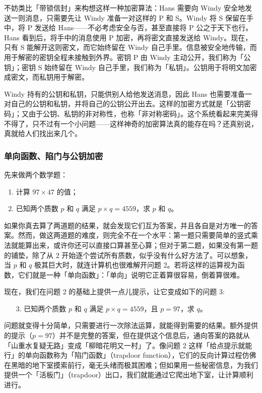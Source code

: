 不妨类比「带锁信封」来构想这样一种加密算法：Hans 需要向 Windy 安全地发送一则消息，只需要先让 Windy 准备一对这样的 P 和 S。Windy 将 S 保留在手中，将 P 发送给 Hans——不必考虑安全与否，甚至直接将 P 公之于天下也行。Hans 看到后，将手中的消息使用 P 加密，再将密文直接发送给 Windy。现在，只有 S 能解开这则密文，而它始终留在 Windy 自己手里。信息被安全地传输，而用于解密的密钥全程未接触到外界。密钥 P 由 Windy 主动公开，我们称为「公钥」；密钥 S 始终留在 Windy 自己手里，我们称为「私钥」。公钥用于将明文加密成密文，而私钥用于解密。

Windy 持有的公钥和私钥，只能供别人给他发送消息，因此 Hans 也需要准备一对自己的公钥和私钥，并将自己的公钥公开出去。这样的加密方式就是「公钥密码」；又由于公钥、私钥的非对称性，也称「非对称密码」。这个系统看起来完美得不得了，只不过有一个小问题——这样神奇的加密算法真的能存在吗？还真别说，真就给人们找出来几个。

\subsubsection{单向函数、陷门与公钥加密}

先来做两个数学题：
\begin{enumerate}
  \item 计算 $97\times 47$ 的值；
  \item 已知两个质数 $p$ 和 $q$ 满足 $p\times q=4559$，求 $p$ 和 $q$。
\end{enumerate}

如果你真去算了两道题的结果，就会发现它们互为答案，并且各自是对方唯一的答案。然而，做这两道题的难度，则完全不在一个水平：第一题只需要简单的竖式乘法就能算出来，或许你还可以直接口算甚至心算；但对于第二题，如果没有第一题的铺垫，除了从 2 开始逐个尝试所有质数，似乎没有什么好方法了。可以想象，当 $p$ 和 $q$ 极其巨大时，就连计算机也很难解开问题 2。若将这样的运算视为函数，它们就是一种「单向函数」：「单向」说明它正着算很容易，倒着算很难。

现在，我们在问题 2 的基础上提供一点儿提示，让它变成如下的问题 3:
\begin{enumerate}
  \item[3.] 已知两个质数 $p$ 和 $q$ 满足 $p\times q=4559$，且 $p=97$，求 $q$。
\end{enumerate}
问题就变得十分简单，只需要进行一次除法运算，就能得到需要的结果。额外提供的提示（$p=97$）并不是完整的答案，但在提供这个信息后，通向答案的路就从「山重水复疑无路」变成「柳暗花明又一村」了。像问题 2 这样「给点提示就能行」的单向函数称为「陷门函数」（trapdoor function），它们的反向计算过程仿佛在黑暗的地下室摸索前行，毫无头绪而极其困难；但如果用一些秘密信息，为我们提供一个「活板门」（trapdoor）出口，我们就能通过它爬出地下室，让计算顺利进行。

